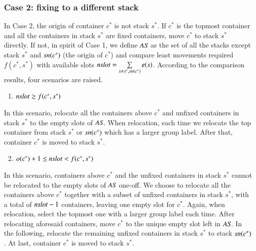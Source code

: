\documentclass[review,3p,times,authoryear,12pt]{elsarticle}
\begin{document}
\subsubsection{Case 2: fixing to a different stack}
In Case 2, the origin of container $c^*$ is not stack $s^*$. If $c^*$ is the topmost container and all the containers in stack $s^*$ are fixed containers, move $c^*$ to stack $s^*$ directly. If not, in spirit of Case 1, we define $\id{AS}$ as the set of all the stacks except stack $s^*$ and $\id{sn}(c^*)$ (the origin of $c^*$) and compare least movements required $f(c^*,s^*)$ with available slots $\id{nslot}=\sum\limits_{s\neq s^*,\id{sn}(c^*)}e(s)$. According to the comparison results, four scenarios are raised.
\begin{enumerate}
\setcounter{enumi}{0}
\item $\id{nslot}\ge f(c^*,s^*)$
\end{enumerate}
In this scenario, relocate all the containers above $c^*$ and unfixed containers in stack $s^*$ to the empty slots of $\id{AS}$. When relocation, each time we relocate the top container from stack $s^*$ or $\id{sn}(c^*)$ which has a larger group label. After that, container $c^*$ is moved to stack $s^*$.

\begin{enumerate}
\setcounter{enumi}{1}
\item $o(c^*)+1\le\id{nslot}< f(c^*,s^*)$
\end{enumerate}
In this scenario, containers above $c^*$ and the unfixed containers in stack $s^*$ cannot be relocated to the empty slots of $\id{AS}$ one-off. We choose to relocate all the containers above $c^*$ together with a subset of unfixed containers in stack $s^*$, with a total of $\id{nslot}-1$ containers, leaving one empty slot for $c^*$. Again, when relocation, select the topmost one with a larger group label each time. After relocating aforesaid containers, move $c^*$ to the unique empty slot left in $\id{AS}$. In the following, relocate the remaining unfixed containers in stack $s^*$ to stack $\id{sn}(c^*)$. At last, container $c^*$ is moved to stack $s^*$.
\end{document}
